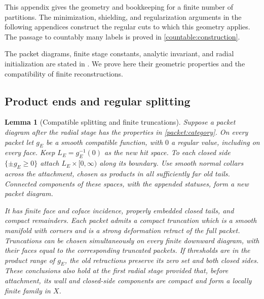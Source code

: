 \documentclass[11pt]{article}
\numberwithin{equation}{section}
\newtheorem{lemma}[theorem]{Lemma}
\theoremstyle{definition}
\theoremstyle{remark}
\begin{document}
This appendix gives the geometry and bookkeeping for a finite number of
partitions.  The minimization, shielding, and regularization arguments
in the following appendices construct the regular cuts to which this
geometry applies.  The passage to countably many labels is proved in
\cref{countable:construction}.

The packet diagrams, finite stage constants, analytic invariant, and
radial initialization are stated in . We prove here
their geometric properties and the compatibility of finite reconstructions.

\subsection{Product ends and regular splitting}

\begin{lemma}[Compatible splitting and finite truncations]\label{packet:split}
Suppose a packet diagram after the radial stage has the properties in
\cref{packet:category}.  On every packet let $g_E$ be a smooth compatible
function, with $0$ a regular value, including on every face.
Keep $L_E=g_E^{-1}(0)$ as the new hit space.  To each closed side
$\{\pm g_E\ge0\}$ attach $L_E\times[0,\infty)$ along its boundary.
Use smooth normal collars across the attachment, chosen as products
in all sufficiently far old tails.  Connected components of these
spaces, with the appended statuses, form a new packet diagram.

It has finite face and coface incidence, properly embedded closed tails,
and compact remainders.  Each packet admits a compact truncation which
is a smooth manifold with corners and is a strong deformation retract
of the full packet.  Truncations can be chosen simultaneously on every
finite downward diagram, with their faces equal to the corresponding
truncated packets.  If thresholds are in the product range of $g_E$,
the old retractions preserve its zero set and both closed sides.
These conclusions also hold at the first radial stage provided that,
before attachment, its wall and closed-side components are compact and
form a locally finite family in $X$.
\end{lemma}
\end{document}
